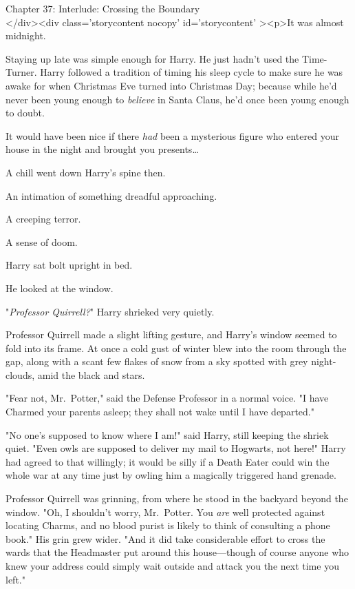 
Chapter 37: Interlude: Crossing the Boundary\\
</div><div  class='storycontent nocopy' id='storycontent' ><p>It was almost midnight.

Staying up late was simple enough for Harry. He just hadn't used the Time-Turner. Harry followed a tradition of timing his sleep cycle to make sure he was awake for when Christmas Eve turned into Christmas Day; because while he'd never been young enough to \emph{believe} in Santa Claus, he'd once been young enough to doubt.

It would have been nice if there \emph{had} been a mysterious figure who entered your house in the night and brought you presents{\ldots}

A chill went down Harry's spine then.

An intimation of something dreadful approaching.

A creeping terror.

A sense of doom.

Harry sat bolt upright in bed.

He looked at the window.

"\emph{Professor Quirrell?}" Harry shrieked very quietly.

Professor Quirrell made a slight lifting gesture, and Harry's window seemed to fold into its frame. At once a cold gust of winter blew into the room through the gap, along with a scant few flakes of snow from a sky spotted with grey night-clouds, amid the black and stars.

"Fear not, Mr.~Potter," said the Defense Professor in a normal voice. "I have Charmed your parents asleep; they shall not wake until I have departed."

"No one's supposed to know where I am!" said Harry, still keeping the shriek quiet. "Even owls are supposed to deliver my mail to Hogwarts, not here!" Harry had agreed to that willingly; it would be silly if a Death Eater could win the whole war at any time just by owling him a magically triggered hand grenade.

Professor Quirrell was grinning, from where he stood in the backyard beyond the window. "Oh, I shouldn't worry, Mr.~Potter. You \emph{are} well protected against locating Charms, and no blood purist is likely to think of consulting a phone book." His grin grew wider. "And it did take considerable effort to cross the wards that the Headmaster put around this house---though of course anyone who knew your address could simply wait outside and attack you the next time you left."

